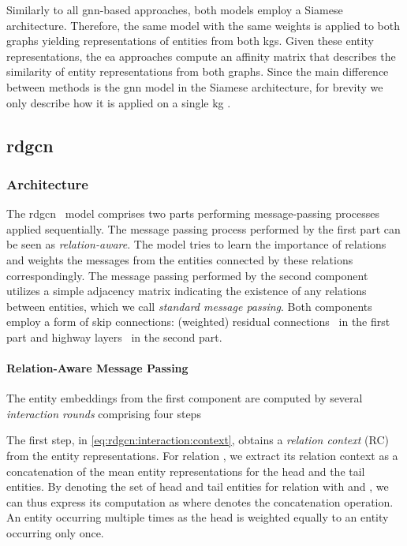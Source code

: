\documentclass[runningheads]{llncs}
\begin{document}
Similarly to all \gls{gnn}-based approaches, both models employ a Siamese architecture. 
Therefore, the same model with the same weights is applied to both graphs yielding representations of entities from both \glspl{kg}. 
Given these entity representations, the \gls{ea} approaches compute an affinity matrix that describes the similarity of entity representations from both graphs.
Since the main difference between methods is the \gls{gnn} model in the Siamese architecture, for brevity we only describe how it is applied on a single \gls{kg} .

\subsection{\acrfull{rdgcn}}

\subsubsection{Architecture}
The \acrshort{rdgcn}~\cite{DBLP:conf/ijcai/WuLF0Y019} model comprises two parts performing message-passing processes applied sequentially.
The message passing process performed by the first part can be seen as \emph{relation-aware}.
The model tries to learn the importance of relations and weights the messages from the entities connected by these relations correspondingly. 
The message passing performed by the second component utilizes a simple adjacency matrix indicating the existence of any relations between entities, which we call \emph{standard message passing}.
Both components employ a form of skip connections: (weighted) residual connections~\cite{DBLP:conf/cvpr/HeZRS16} in the first part and highway layers~\cite{DBLP:journals/corr/SrivastavaGS15} in the second part.

\paragraph{Relation-Aware Message Passing}
The entity embeddings from the first component 
are computed by several \emph{interaction rounds} comprising four steps

The first step, in \eqref{eq:rdgcn:interaction:context}, obtains a \emph{relation context} (RC)  from the entity representations.
For relation , we extract its relation context as a concatenation of the mean entity representations for the head and the tail entities.
By denoting the set of head and tail entities for relation  with  and , we can thus express its computation as
 where  denotes the concatenation operation.
An entity occurring multiple times as the head is weighted equally to an entity occurring only once.
\end{document}
